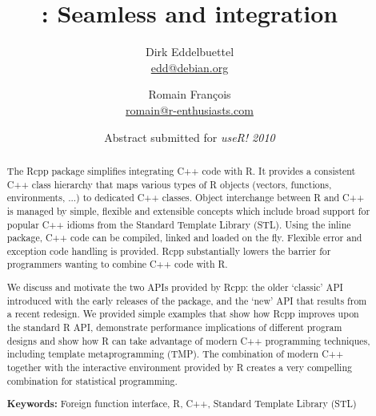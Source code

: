 \documentclass[11pt]{article}
\author{Dirk Eddelbuettel\\ {\small \url{edd@debian.org} }
  \and Romain Fran\c{c}ois\\ {\small \url{romain@r-enthusiasts.com} } }
\title{\pkg{Rcpp}: Seamless \proglang{R} and \proglang{C++} integration}
\date{Abstract submitted for \textsl{useR! 2010}}
\newcommand{\proglang}[1]{\textsf{#1}}
\newcommand{\pkg}[1]{{\fontseries{b}\selectfont #1}}
\begin{document}
\maketitle
\thispagestyle{empty}
\begin{abstract}
  \addtolength{\parskip}{\baselineskip} 	%
  \noindent %
  The \pkg{Rcpp} package simplifies integrating \proglang{C++} code with
  \proglang{R}. It provides a consistent \proglang{C++} class hierarchy that
  maps various types of \proglang{R} objects (vectors, functions,
  environments, ...) to dedicated \proglang{C++} classes. Object interchange
  between \proglang{R} and \proglang{C++} is managed by simple, flexible and
  extensible concepts which include broad support for popular \proglang{C++}
  idioms from the Standard Template Library (STL). Using the \pkg{inline}
  package, \proglang{C++} code can be compiled, linked and loaded on the fly.
  Flexible error and exception code handling is provided.  \pkg{Rcpp}
  substantially lowers the barrier for programmers wanting to combine
  \proglang{C++} code with \proglang{R}.
  
  We discuss and motivate the two APIs provided by \pkg{Rcpp}: the older
  `classic' API introduced with the early releases of the package, and the
  `new' API that results from a recent redesign. We provided simple examples
  that show how \pkg{Rcpp} improves upon the standard \proglang{R} API,
  demonstrate performance implications of different program designs and show
  how \proglang{R} can take advantage of modern \proglang{C++} programming
  techniques, including template metaprogramming (TMP).  
  The combination of modern \proglang{C++} together with the interactive
  environment provided by \proglang{R} creates a very compelling combination
  for statistical programming.
  
  \noindent \textbf{Keywords:} Foreign function interface, 
  \proglang{R}, \proglang{C++}, Standard Template Library (STL)
\end{abstract}
\end{document}
